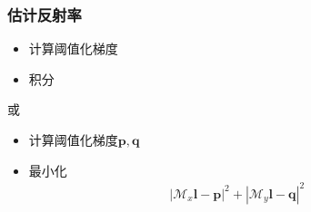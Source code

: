 \documentclass{beamer}
\newcommand{\tmmathbf}[1]{\ensuremath{\boldsymbol{#1}}}
\newenvironment{itemizedot}{\begin{itemize} \renewcommand{\labelitemi}{$\bullet$}\renewcommand{\labelitemii}{$\bullet$}\renewcommand{\labelitemiii}{$\bullet$}\renewcommand{\labelitemiv}{$\bullet$}}{\end{itemize}}
\begin{document}
{{\begin{frame}
  {\hspace{7em}}
\end{frame}

\begin{frame}
  \frametitle{估计反射率}
  
  
  \begin{itemizedot}
    \item 计算阈值化梯度
    
    \item 积分
  \end{itemizedot}
  
  
  或
  
  
  \begin{itemizedot}
    \item 计算阈值化梯度$\tmmathbf{p}, \tmmathbf{q}$
    
    \item 最小化
    \begin{eqnarray*}
      | \mathcal{M}_x \tmmathbf{l}-\tmmathbf{p} |^2 + | \mathcal{M}_y
      \tmmathbf{l}-\tmmathbf{q} |^2 &  & 
    \end{eqnarray*}
  \end{itemizedot}
  

\end{frame}}}
\end{document}
